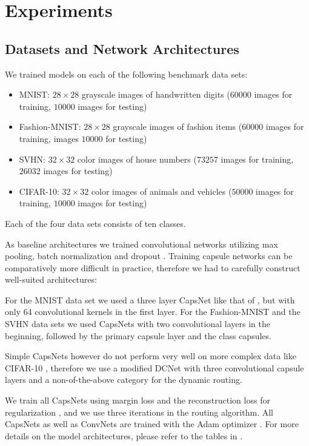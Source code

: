 
\section{Experiments}
\label{sec:experiments}

\subsection{Datasets and Network Architectures}

We trained models on each of the following benchmark data sets:

\begin{itemize}
	\item MNIST: $28\times28$ grayscale images of handwritten digits ($60000$  images for training, $10000$  images for testing) \cite{mnist}
	\item Fashion-MNIST:  $28\times28$ grayscale images of fashion items ($60000$ images for training, images $10000$ for testing) \cite{fashion}
	\item SVHN: $32\times32$ color images of house numbers ($73257$  images for training, $26032$ images for testing) \cite{svhn}
	\item CIFAR-10: $32\times32$ color images of animals and vehicles ($50000$  images for training, $10000$  images for testing) \cite{cifar}
\end{itemize}

Each of the four data sets consists of ten classes.

As baseline architectures we trained convolutional networks utilizing max pooling, batch normalization \citep{batchnorm} and dropout \citep{dropout}.
Training capsule networks can be comparatively more difficult in practice, therefore we had to carefully construct well-suited architectures:

For the MNIST data set we used a three layer CapsNet like that of \citet{capsules}, but with only 64 convolutional kernels in the first layer.
For the Fashion-MNIST and the SVHN data sets we used CapsNets with two convolutional layers in the beginning, followed by the primary capsule layer and the class capsules.

Simple CapsNets however do not perform very well on more complex data like \mbox{CIFAR-10} \citep{complex}, therefore we use a modified DCNet \citep{dcnet} with three convolutional capsule layers and a non-of-the-above category for the dynamic routing.

We train all CapsNets using margin loss and the reconstruction loss for regularization \citep{capsules}, and we use three iterations in the routing algorithm.
All CapsNets as well as ConvNets are trained with the Adam optimizer \citep{adam}.
For more details on the model architectures, please refer to the tables in .

